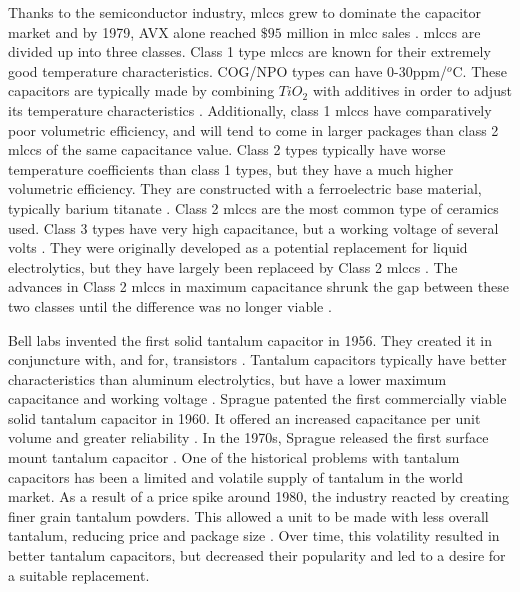 Thanks to the semiconductor industry, \glspl{mlcc} grew to dominate the capacitor market and by 1979, AVX alone reached $\$95$ million in \gls{mlcc} sales \cite{avx_hist}.
\glspl{mlcc} are divided up into three classes. Class 1 type \glspl{mlcc} are known for their extremely good temperature characteristics. COG/NPO types can have 0-30ppm/$^o$C. These capacitors are typically made by combining $TiO_2$ with additives in order to adjust its temperature characteristics \cite{intro_cerCaps}. Additionally, class 1 \glspl{mlcc} have comparatively poor volumetric efficiency, and will tend to come in larger packages than class 2 \glspl{mlcc} of the same capacitance value. Class 2 types typically have worse temperature coefficients than class 1 types, but they have a much higher volumetric efficiency. They are constructed with a ferroelectric base material, typically barium titanate \cite{intro_cerCaps}. Class 2 \glspl{mlcc} are the most common type of ceramics used. Class 3 types have very high capacitance, but a working voltage of several volts \cite{hist_cerFilt}\cite[Ch 3 Sec VI]{cerMaterials}\cite{atCer_tempco}. They were originally developed as a potential replacement for liquid electrolytics, but they have largely been replaceed by Class 2 \glspl{mlcc} \cite{wiki_cer}. The advances in Class 2 \glspl{mlcc} in maximum capacitance shrunk the gap between these two classes until the difference was no longer viable \cite{wiki_cer}.

Bell labs invented the first solid tantalum capacitor in 1956. They created it in conjuncture with, and for, transistors \cite[f.~56-64]{dumInv}. Tantalum capacitors typically have better characteristics than aluminum electrolytics, but have a lower maximum capacitance and working voltage \cite{learn_caps}.
Sprague patented the first commercially viable solid tantalum capacitor in 1960. It offered an increased capacitance per unit volume and greater reliability \cite{charTant}. In the 1970s, Sprague released the first surface mount tantalum capacitor \cite{spragueHist}.
One of the historical problems with tantalum capacitors has been a limited and volatile supply of tantalum in the world market.
As a result of a price spike around 1980, the industry reacted by creating finer grain tantalum powders. This allowed a unit to be made with less overall tantalum, reducing price and package size \cite[ch~3.1]{tantMis}. Over time, this volatility resulted in better tantalum capacitors, but decreased their popularity and led to a desire for a suitable replacement.

